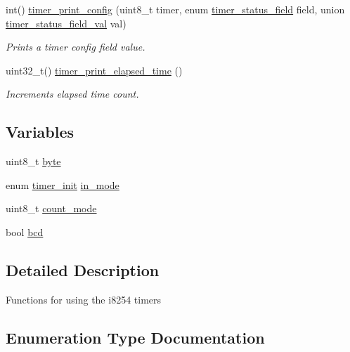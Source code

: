 \begin{DoxyCompactItemize}
int() \hyperlink{group__timer_gad3902e029b27c80982873394c0290496}{timer\+\_\+print\+\_\+config} (uint8\+\_\+t timer, enum \hyperlink{group__timer_gada782f3116a896caaa602b70c0c6d8b7}{timer\+\_\+status\+\_\+field} field, union \hyperlink{uniontimer__status__field__val}{timer\+\_\+status\+\_\+field\+\_\+val} val)
\begin{DoxyCompactList}\small\item\em Prints a timer config field value. \end{DoxyCompactList}\item 
uint32\+\_\+t() \hyperlink{group__timer_ga43b221cba0c39b32f89688dcfee5aefa}{timer\+\_\+print\+\_\+elapsed\+\_\+time} ()
\begin{DoxyCompactList}\small\item\em Increments elapsed time count. \end{DoxyCompactList}\end{DoxyCompactItemize}
\subsection*{Variables}
\begin{DoxyCompactItemize}
\item 
uint8\+\_\+t \hyperlink{group__timer_ga96f44d20f1dbf1c8785a7bc99a46164c}{byte}
\item 
enum \hyperlink{group__timer_ga5cc20f14fd50625eea9b20f58fbe2a55}{timer\+\_\+init} \hyperlink{group__timer_gad414fb8742e435f9bda1f199a6200645}{in\+\_\+mode}
\item 
uint8\+\_\+t \hyperlink{group__timer_gabd6e94a182fc2daff67dfb46f732644a}{count\+\_\+mode}
\item 
bool \hyperlink{group__timer_gaa2444cde256beeae6fb06bb7a5ebd0c9}{bcd}
\end{DoxyCompactItemize}


\subsection{Detailed Description}
Functions for using the i8254 timers 

\subsection{Enumeration Type Documentation}
\mbox{\label{group__timer_ga5cc20f14fd50625eea9b20f58fbe2a55}} 
